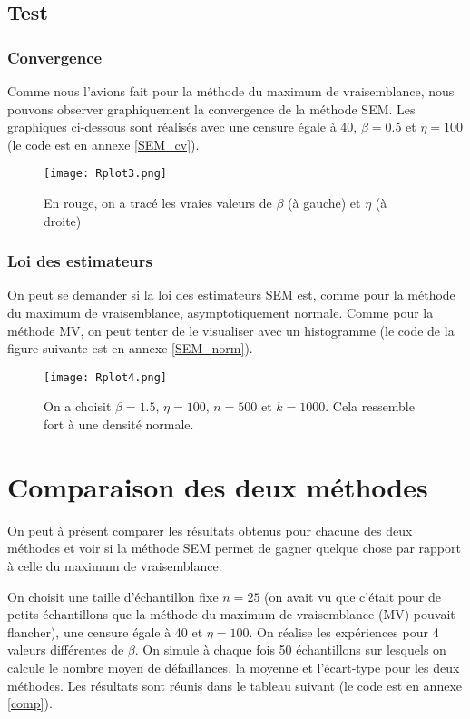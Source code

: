 \documentclass[a4paper]{report}
\begin{document}
 \section{Test}
 
 \subsection{Convergence}
 
 Comme nous l'avions fait pour la méthode du maximum de vraisemblance, nous pouvons observer graphiquement la convergence de la méthode SEM. Les graphiques ci-dessous sont réalisés avec une censure égale à 40, $\beta=0.5$ et $\eta=100$ (le code est en annexe \ref{SEM_cv}).
 
\begin{figure}[!ht]
	\centering
     	\texttt{[image: Rplot3.png]}

	\caption{En rouge, on a tracé les vraies valeurs de $\beta$ (à gauche) et $\eta$ (à droite)}
\end{figure}  

 \subsection{Loi des estimateurs}
 
 On peut se demander si la loi des estimateurs SEM est, comme pour la méthode du maximum de vraisemblance, asymptotiquement normale. Comme pour la méthode MV, on peut tenter de le visualiser avec un histogramme (le code de la figure suivante est en annexe \ref{SEM_norm}). 
 
 \begin{figure}[!ht]
	\centering
     	\texttt{[image: Rplot4.png]}

	\caption{On a choisit $\beta=1.5$, $\eta=100$, $n=500$ et $k=1000$. Cela ressemble fort à une densité normale.}
\end{figure}
  
\chapter{Comparaison des deux méthodes}

 On peut à présent comparer les résultats obtenus pour chacune des deux méthodes et voir si la méthode SEM permet de gagner quelque chose par rapport à celle du maximum de vraisemblance. 
 
 On choisit une taille d'échantillon fixe $n=25$ (on avait vu que c'était pour de petits échantillons que la méthode du maximum de vraisemblance (MV) pouvait flancher), une censure égale à 40 et $\eta=100$. On réalise les expériences pour 4 valeurs différentes de $\beta$. On simule à chaque fois 50 échantillons sur lesquels on calcule le nombre moyen de défaillances, la moyenne et l'écart-type pour les deux méthodes. Les résultats sont réunis dans le tableau suivant (le code est en annexe \ref{comp}).
 
\end{document}
